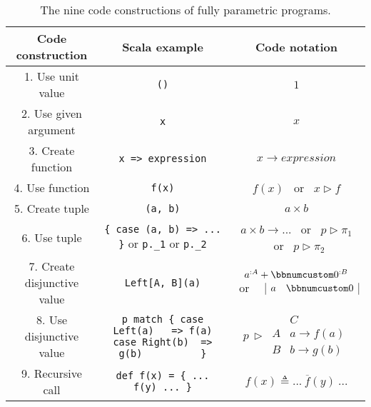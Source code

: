 \begin{table}
\begin{centering}
\begin{tabular}{|c|c|c|}
\hline 
\textbf{\small{}Code construction} & \textbf{\small{}Scala example} & \textbf{\small{}Code notation}\tabularnewline
\hline 
\hline 
{\small{}1. Use unit value} & {\small{}}\lstinline!()! & {\small{}$1$}\tabularnewline
\hline 
{\small{}2. Use given argument} & {\small{}}\lstinline!x! & {\small{}$x$}\tabularnewline
\hline 
{\small{}3. Create function} & {\small{}}\lstinline!x => expression! & {\small{}$x\rightarrow expression$}\tabularnewline
\hline 
{\small{}4. Use function} & {\small{}}\lstinline!f(x)! & $f(x)$ ~or~ $x\triangleright f$\tabularnewline
\hline 
{\small{}5. Create tuple} & {\small{}}\lstinline!(a, b)! & {\small{}$a\times b$}\tabularnewline
\hline 
{\small{}6. Use tuple} & {\small{}}\lstinline!{ case (a, b) => ... }!{\small{} or }\lstinline!p._1!{\small{}
or }\lstinline!p._2!{\small{} } & {\small{}$a\times b\rightarrow...$ ~or~ $p\triangleright\pi_{1}$
~or~ $p\triangleright\pi_{2}$}\tabularnewline
\hline 
{\small{}7. Create disjunctive value} & {\small{}}\lstinline!Left[A, B](a)! & {\small{}}%
\begin{minipage}[c]{0.19\columnwidth}%
{\small{}\vspace{0.2\baselineskip}
$a^{:A}+\bbnum 0^{:B}$ ~or~~ $\begin{array}{|cc|}
a & \bbnum 0\end{array}$\vspace{0.2\baselineskip}
}%
\end{minipage}\tabularnewline
\hline 
{\small{}8. Use disjunctive value} & {\small{}}%
\begin{minipage}[c]{0.33\columnwidth}%
{\small{}}\lstinline!p match { case Left(a)   => f(a)            case Right(b)  => g(b)          }!%
\end{minipage} & {\small{}}%
\begin{minipage}[c]{0.23\columnwidth}%
{\small{}\vspace{0.2\baselineskip}
$p\,\triangleright\,\begin{array}{|c||c|}
 & C\\
\hline A & a\rightarrow f(a)\\
B & b\rightarrow g(b)
\end{array}$\vspace{0.2\baselineskip}
}%
\end{minipage}\tabularnewline
\hline 
{\small{}9. Recursive call} & {\small{}}\lstinline!def f(x) = { ... f(y) ... }! & {\small{}$f(x)\triangleq...~\overline{f}(y)~...$}\tabularnewline
\hline 
\end{tabular}
\par\end{centering}
\caption{The nine code constructions
of fully parametric programs.\label{tab:nine-pure-code-constructions}}
\end{table}

